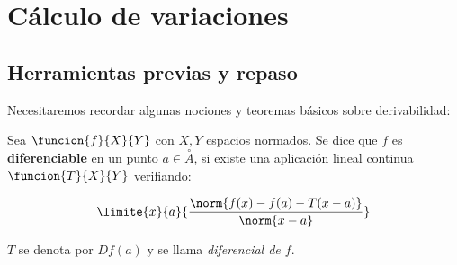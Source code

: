 \section{Cálculo de variaciones}

\subsection{Herramientas previas y repaso}

Necesitaremos recordar algunas nociones y teoremas básicos sobre derivabilidad:

\begin{definition}
\label{funciondiferenciable}

Sea $\funcion{f}{X}{Y}$ con $X,Y$ espacios normados. Se dice que $f$ es \textbf{diferenciable} en un punto $a\in\overset{\circ}{A}$, si existe una aplicación lineal continua $\funcion{T}{X}{Y}$ verifiando:

\[
\limite{x}{a}{\frac{\norm{f(x)-f(a)-T(x-a)}}{\norm{x-a}}}
\]

$T$ se denota por $Df(a)$ y se llama \textit{diferencial de $f$}.
\end{definition}